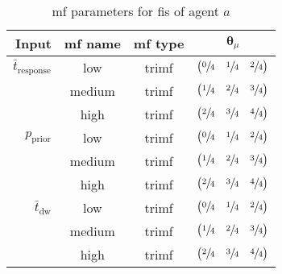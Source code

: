 \documentclass[conference]{IEEEtran}
\begin{document}
\begin{table}[h]
    \centering
    \caption{\gls{mf} parameters for \gls{fis} of agent $a$}
    \label{tab:fis_mf_params}
    \begin{tabular}{r|ccc}
        \toprule
        Input   & \gls{mf} name &  \gls{mf} type  & $\bm{\theta}_{\mu}$ \\
        \midrule
        $\bar{t}_{\text{response}}$    & low       & trimf     & $\begin{pmatrix} \sfrac{0}{4} & \sfrac{1}{4} & \sfrac{2}{4} \end{pmatrix}$ \\
                    & medium    & trimf     & $\begin{pmatrix} \sfrac{1}{4} & \sfrac{2}{4} & \sfrac{3}{4} \end{pmatrix}$ \\
                    & high      & trimf     & $\begin{pmatrix} \sfrac{2}{4} & \sfrac{3}{4} & \sfrac{4}{4} \end{pmatrix}$ \\
        $p_{\text{prior}}$    & low       & trimf     & $\begin{pmatrix} \sfrac{0}{4} & \sfrac{1}{4} & \sfrac{2}{4} \end{pmatrix}$ \\
                    & medium    & trimf     & $\begin{pmatrix} \sfrac{1}{4} & \sfrac{2}{4} & \sfrac{3}{4} \end{pmatrix}$ \\
                    & high      & trimf     & $\begin{pmatrix} \sfrac{2}{4} & \sfrac{3}{4} & \sfrac{4}{4} \end{pmatrix}$ \\
        $\bar{t}_{\text{dw}}$       & low       & trimf     & $\begin{pmatrix} \sfrac{0}{4} & \sfrac{1}{4} & \sfrac{2}{4} \end{pmatrix}$ \\
                    & medium    & trimf     & $\begin{pmatrix} \sfrac{1}{4} & \sfrac{2}{4} & \sfrac{3}{4} \end{pmatrix}$ \\
                    & high      & trimf     & $\begin{pmatrix} \sfrac{2}{4} & \sfrac{3}{4} & \sfrac{4}{4} \end{pmatrix}$ \\
        \bottomrule
    \end{tabular}
\end{table}
\end{document}
